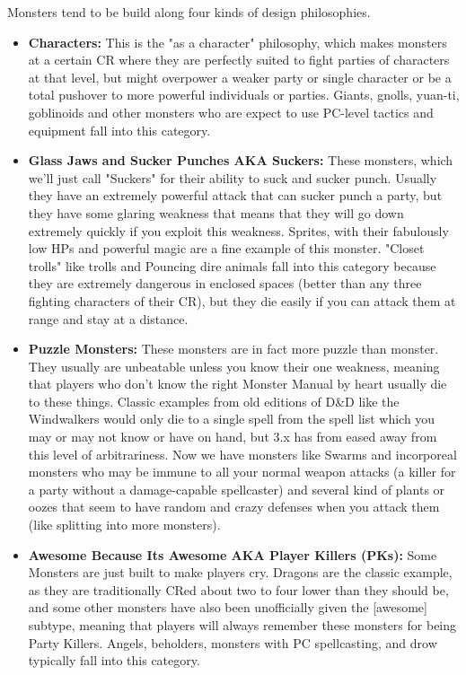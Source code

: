Monsters tend to be build along four kinds of design philosophies.

\begin{itemize}\itemspace
   \item \textbf{Characters:} This is the "as a character" philosophy, which makes monsters at a certain CR where they are perfectly suited to fight parties of characters at that level, but might overpower a weaker party or single character or be a total pushover to more powerful individuals or parties. Giants, gnolls, yuan-ti, goblinoids and other monsters who are expect to use PC-level tactics and equipment fall into this category.
   \item \textbf{Glass Jaws and Sucker Punches AKA Suckers:} These monsters, which we'll just call "Suckers" for their ability to suck and sucker punch. Usually they have an extremely powerful attack that can sucker punch a party, but they have some glaring weakness that means that they will go down extremely quickly if you exploit this weakness. Sprites, with their fabulously low HPs and powerful magic are a fine example of this monster. "Closet trolls" like trolls and Pouncing dire animals fall into this category because they are extremely dangerous in enclosed spaces (better than any three fighting characters of their CR), but they die easily if you can attack them at range and stay at a distance.
   \item \textbf{Puzzle Monsters:} These monsters are in fact more puzzle than monster. They usually are unbeatable unless you know their one weakness, meaning that players who don't know the right Monster Manual by heart usually die to these things. Classic examples from old editions of D\&D like the Windwalkers would only die to a single spell from the spell list which you may or may not know or have on hand, but 3.x has from eased away from this level of arbitrariness. Now we have monsters like Swarms and incorporeal monsters who may be immune to all your normal weapon attacks (a killer for a party without a damage-capable spellcaster) and several kind of plants or oozes that seem to have random and crazy defenses when you attack them (like splitting into more monsters).
   \item \textbf{Awesome Because Its Awesome AKA Player Killers (PKs):} Some Monsters are just built to make players cry. Dragons are the classic example, as they are traditionally CRed about two to four lower than they should be, and some other monsters have also been unofficially given the [awesome] subtype, meaning that players will always remember these monsters for being Party Killers. Angels, beholders, monsters with PC spellcasting, and drow typically fall into this category.
\end{itemize}


